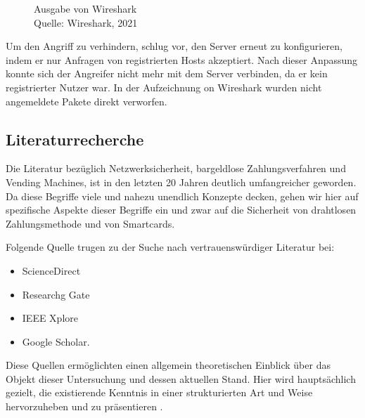 \begin{figure}[H]
  \caption{Ausgabe von Wireshark \\Quelle: Wireshark, 2021}
  \label{fig:refst_wisa}
\end{figure}

Um den Angriff zu verhindern, schlug \cite{refip:NYRS} vor, den Server erneut zu konfigurieren, indem er nur Anfragen von
registrierten Hosts akzeptiert. Nach dieser Anpassung konnte sich der Angreifer nicht mehr mit dem Server verbinden, da 
er kein registrierter Nutzer war. In der Aufzeichnung on Wireshark wurden nicht angemeldete Pakete direkt verworfen.



\subsection{Literaturrecherche}

Die Literatur bezüglich Netzwerksicherheit, bargeldlose Zahlungsverfahren und Vending Machines, ist in den 
letzten 20 Jahren deutlich umfangreicher geworden. Da diese Begriffe viele und nahezu unendlich Konzepte 
decken, gehen wir hier auf spezifische Aspekte dieser Begriffe ein und zwar auf die Sicherheit von drahtlosen 
Zahlungsmethode und von Smartcards. 

Folgende Quelle trugen zu der Suche nach vertrauenswürdiger Literatur bei:

\begin{itemize}
    \item ScienceDirect
    \item Researchg Gate
    \item IEEE Xplore
    \item Google Scholar.
\end{itemize}

Diese Quellen ermöglichten einen allgemein theoretischen Einblick über das Objekt dieser Untersuchung und
dessen aktuellen Stand. Hier wird hauptsächlich gezielt, die existierende Kenntnis in einer strukturierten
Art und Weise hervorzuheben und zu präsentieren \cite{refbook:SRJR}.
